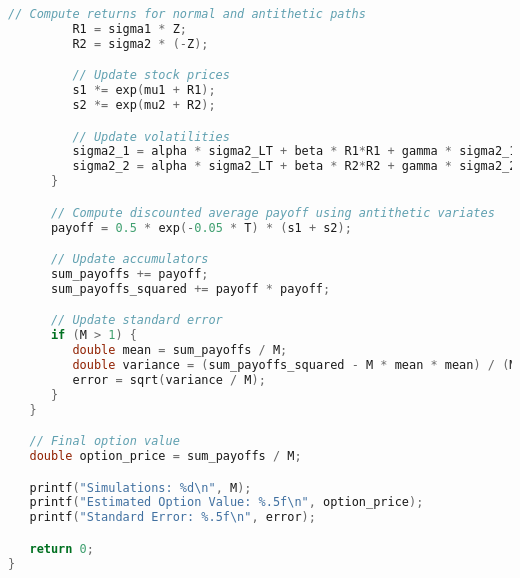 \documentclass{report}
\begin{document}
\begin{lstlisting}[language=C++]
         // Compute returns for normal and antithetic paths
         R1 = sigma1 * Z;
         R2 = sigma2 * (-Z);

         // Update stock prices
         s1 *= exp(mu1 + R1);
         s2 *= exp(mu2 + R2);

         // Update volatilities
         sigma2_1 = alpha * sigma2_LT + beta * R1*R1 + gamma * sigma2_1;
         sigma2_2 = alpha * sigma2_LT + beta * R2*R2 + gamma * sigma2_2;
      }

      // Compute discounted average payoff using antithetic variates
      payoff = 0.5 * exp(-0.05 * T) * (s1 + s2);

      // Update accumulators
      sum_payoffs += payoff;
      sum_payoffs_squared += payoff * payoff;

      // Update standard error 
      if (M > 1) {
         double mean = sum_payoffs / M;
         double variance = (sum_payoffs_squared - M * mean * mean) / (M-1);
         error = sqrt(variance / M);
      }
   }

   // Final option value
   double option_price = sum_payoffs / M;

   printf("Simulations: %d\n", M);
   printf("Estimated Option Value: %.5f\n", option_price);
   printf("Standard Error: %.5f\n", error);

   return 0;
}
\end{lstlisting}
\end{document}
